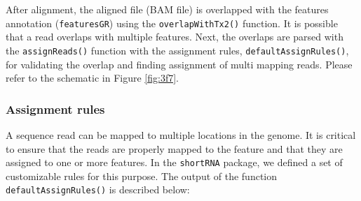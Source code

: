 \documentclass[12pt,twoside]{reedthesis}
\begin{document}
After alignment, the aligned file (BAM file) is overlapped with the
features annotation (\texttt{featuresGR}) using the \texttt{overlapWithTx2()} function. It
is possible that a read overlaps with multiple features. Next, the
overlaps are parsed with the \texttt{assignReads()} function with the assignment
rules, \texttt{defaultAssignRules()}, for validating the overlap and finding
assignment of multi mapping reads. Please refer to the schematic in
Figure \ref{fig:3f7}.

\hypertarget{assignment-rules}{%
\subsubsection{Assignment rules}\label{assignment-rules}}

A sequence read can be mapped to multiple locations in the genome. It is
critical to ensure that the reads are properly mapped to the feature and
that they are assigned to one or more features. In the \texttt{shortRNA} package,
we defined a set of customizable rules for this purpose. The output of
the function \texttt{defaultAssignRules()} is described below:
\end{document}
